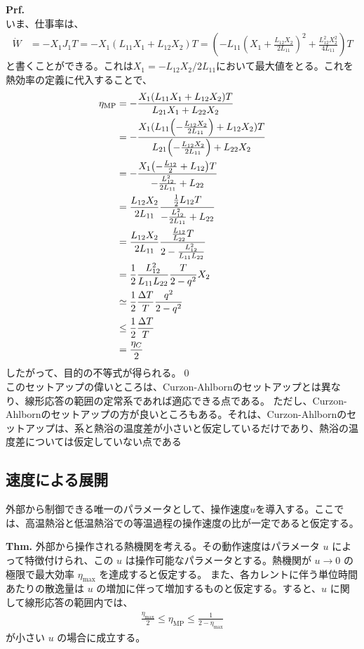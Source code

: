 \documentclass[a4paper,11pt]{jsarticle}
\numberwithin{equation}{section}
\begin{document}
\textbf{Prf.}\\
いま、仕事率は、
\begin{align}
  \dot{W} &= -X_1 J_1 T =-X_1(L_{11} X_1 + L_{12} X_2) T = \left(-L_{11} \left( X_1 + \frac{L_{12} X_2}{2 L_{11}} \right)^2 + \frac{L_{12}^2 X_2^2}{4 L_{11}} \right) T
\end{align}
と書くことができる。これは$X_1 = -L_{12} X_2 / 2 L_{11}$において最大値をとる。これを熱効率の定義に代入することで、
\begin{align}
  \eta_{\text{MP}} &= -\frac{X_1(L_{11} X_1 + L_{12} X_2) T}{L_{21} X_1 + L_{22} X_2} \\
  &= -\frac{X_1(L_{11}\qty(-\frac{L_{12} X_2}{2 L_{11}}) + L_{12} X_2) T}{L_{21} \qty(-\frac{L_{12} X_2}{2 L_{11}}) + L_{22} X_2} \\
  &= -\frac{X_1\qty(-\frac{L_{12}}{2}+ L_{12})T}{-\frac{L_{12}^2}{2L_{11}} + L_{22}} \\
  &= \frac{L_{12} X_2}{2 L_{11} }\frac{\frac{1}{2}L_{12}T}{-\frac{L_{12}^2}{2L_{11}} + L_{22}} \\
  &= \frac{L_{12} X_2}{2 L_{11} }\frac{\frac{L_{12}}{L_{22}}T}{2-\frac{L_{12}^2}{L_{11}L_{22}} } \\
  &= \frac{1}{2} \frac{L_{12}^2}{L_{11}L_{22}} \frac{T}{2-q^2}X_2\\
  &\simeq \frac{1}{2} \frac{\Delta T}{T} \frac{q^2}{2 - q^2} \\
  &\leq \frac{1}{2} \frac{\Delta T}{T}\\
  &= \frac{\eta_C}{2}
\end{align}
したがって、目的の不等式が得られる。\qed\\
このセットアップの偉いところは、Curzon-Ahlbornのセットアップとは異なり、線形応答の範囲の定常系であれば適応できる点である。
ただし、Curzon-Ahlbornのセットアップの方が良いところもある。それは、Curzon-Ahlbornのセットアップは、系と熱浴の温度差が小さいと仮定しているだけであり、熱浴の温度差については仮定していない点である

\subsection{速度による展開}
外部から制御できる唯一のパラメータとして、操作速度$u$を導入する。ここでは、高温熱浴と低温熱浴での等温過程の操作速度の比が一定であると仮定する。
\begin{itembox}[l]{\textbf{Thm.}}
外部から操作される熱機関を考える。その動作速度はパラメータ $u$ によって特徴付けられ、この $u$ は操作可能なパラメータとする。熱機関が $u \to 0$ の極限で最大効率 $\eta_{\text{max}}$ を達成すると仮定する。
また、各カレントに伴う単位時間あたりの散逸量は $u$ の増加に伴って増加するものと仮定する。すると、$u$ に関して線形応答の範囲内では、
\begin{align}
    \frac{\eta_{\text{max}}}{2} \leq \eta_{\text{MP}} \leq \frac{1}{2 - \eta_{\text{max}}}
\end{align}
が小さい $u$ の場合に成立する。
\end{itembox}
\end{document}
